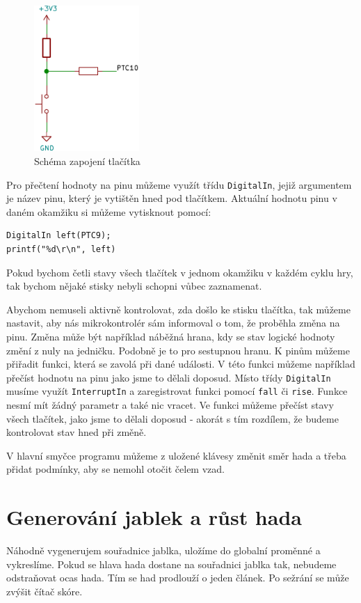 \documentclass[12pt]{article}
\begin{document}
\begin{figure}[ht]
\centering
  \includegraphics[width=4cm]{figures/button}
\caption{Schéma zapojení tlačítka}
 \label{fig:button}
\end{figure}
\FloatBarrier

Pro přečtení hodnoty na pinu můžeme využít třídu \texttt{DigitalIn}, jejiž argumentem je název pinu, který je vytištěn hned pod tlačítkem.
Aktuální hodnotu pinu v daném okamžiku si můžeme vytisknout pomocí:
\begin{verbatim}
DigitalIn left(PTC9);
printf("%d\r\n", left)
\end{verbatim}

Pokud bychom četli stavy všech tlačítek v jednom okamžiku v každém cyklu hry, tak bychom nějaké stisky nebyli schopni vůbec zaznamenat. 

Abychom nemuseli aktivně kontrolovat, zda došlo ke stisku tlačítka, tak můžeme nastavit, aby nás mikrokontrolér sám informoval o tom, že proběhla změna na pinu.
Změna může být například náběžná hrana, kdy se stav logické hodnoty změní z nuly na jedničku.
Podobně je to pro sestupnou hranu.
K pinům můžeme přiřadit funkci, která se zavolá při dané události.
V této funkci můžeme například přečíst hodnotu na pinu jako jsme to dělali doposud.
Místo třídy \texttt{DigitalIn} musíme využít \texttt{InterruptIn} a zaregistrovat funkci pomocí \texttt{fall} či \texttt{rise}.
Funkce nesmí mít žádný parametr a také nic vracet.
Ve funkci můžeme přečíst stavy všech tlačítek, jako jsme to dělali doposud - akorát s tím rozdílem, že budeme kontrolovat stav hned při změně.

V hlavní smyčce programu můžeme z uložené klávesy změnit směr hada a třeba přidat podmínky, aby se nemohl otočit čelem vzad.

\section{Generování jablek a růst hada}
Náhodně vygenerujem souřadnice jablka, uložíme do globalní proměnné a vykreslíme.
Pokud se hlava hada dostane na souřadnici jablka tak, nebudeme odstraňovat ocas hada.
Tím se had prodlouží o jeden článek.
Po sežrání se může zvýšit čítač skóre.
\end{document}
